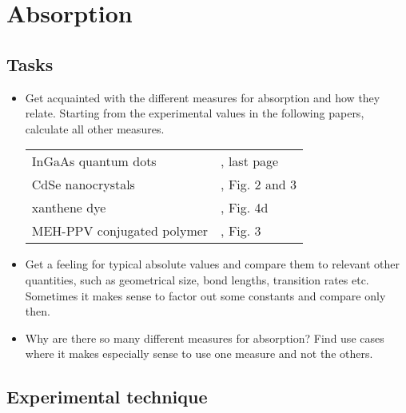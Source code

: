 \renewcommand{\lastmod}{May 4, 2021}
\renewcommand{\chapterauthors}{Markus Lippitz}

\chapter{Absorption}




\section{Tasks}

\begin{itemize}
\item Get acquainted with the different measures for absorption and how they relate. Starting from the experimental values in the following papers, calculate all other measures.

\begin{tabular}{ll}
InGaAs quantum dots & \cite{Borri:2002p139}, last page  \\
CdSe nanocrystals & \cite{Jasieniak:2009er}, Fig. 2 and 3 \\
xanthene dye & \cite{Kastrup:2004p1737}, Fig. 4d   \\
MEH-PPV conjugated polymer  & \cite{Hou:2017jm}, Fig. 3 \\
\end{tabular}


\item Get a feeling for typical absolute values and compare them to relevant  other quantities, such as geometrical size, bond lengths, transition rates etc. Sometimes it makes sense to factor out some constants and compare only then.
\item Why are there so many different measures for absorption? Find use cases where it makes especially sense to use one measure and not the others.

\end{itemize}







\section{Experimental technique}

